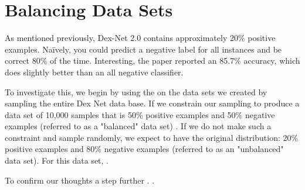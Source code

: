 
\section{Balancing Data Sets}
\label{sec:balance}

As mentioned previously, Dex-Net 2.0 contains approximately 20\% positive examples. 
Na{\"i}vely, you could predict a negative label for all instances and be correct 80\% of the time. Interesting, the paper reported an 85.7\% accuracy, which does slightly better than an all negative classifier. 

To investigate this, we begin by using the  on the data sets we created by sampling the entire Dex Net data base. 
If we constrain our sampling to produce a data set of 10,000 samples that is 50\% positive examples and 50\% negative examples (referred to as a "balanced" data set) . 
If we do not make such a constraint and sample randomly, we expect to have the original distribution: 20\% positive examples and 80\% negative examples (referred to as an "unbalanced" data set). 
For this data set, . 

To confirm our thoughts a step further . . 

